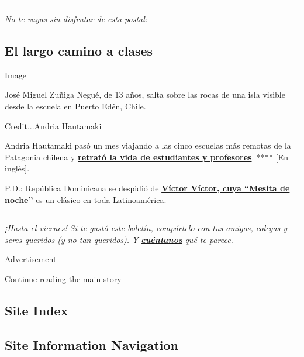 \begin{center}\rule{0.5\linewidth}{\linethickness}\end{center}

\emph{No te vayas sin disfrutar de esta postal:}

\hypertarget{el-largo-camino-a-clases}{%
\subsection{El largo camino a clases}\label{el-largo-camino-a-clases}}

Image

José Miguel Zuñiga Negué, de 13 años, salta sobre las rocas de una isla
visible desde la escuela en Puerto Edén, Chile.

Credit...Andria Hautamaki

Andria Hautamaki pasó un mes viajando a las cinco escuelas más remotas
de la Patagonia chilena y
\textbf{\href{https://www.nytimes3xbfgragh.onion/2020/08/03/travel/remote-schools-patagonia.html}{retrató
la vida de estudiantes y profesores}}. **** {[}En inglés{]}.

P.D.: República Dominicana se despidió de
\textbf{\href{https://www.nytimes3xbfgragh.onion/es/2020/08/03/espanol/cultura/victor-victor-murio-coronavirus.html}{Víctor
Víctor, cuya ``Mesita de noche''}} es un clásico en toda Latinoamérica.

\begin{center}\rule{0.5\linewidth}{\linethickness}\end{center}

\emph{¡Hasta el viernes! Si te gustó este boletín, compártelo con tus
amigos, colegas y seres queridos (y no tan queridos). Y}
\textbf{\href{mailto:comentarios@NYTimes.com}{\emph{cuéntanos}}}
\emph{qué te parece.}

Advertisement

\protect\hyperlink{after-bottom}{Continue reading the main story}

\hypertarget{site-index}{%
\subsection{Site Index}\label{site-index}}

\hypertarget{site-information-navigation}{%
\subsection{Site Information
Navigation}\label{site-information-navigation}}

